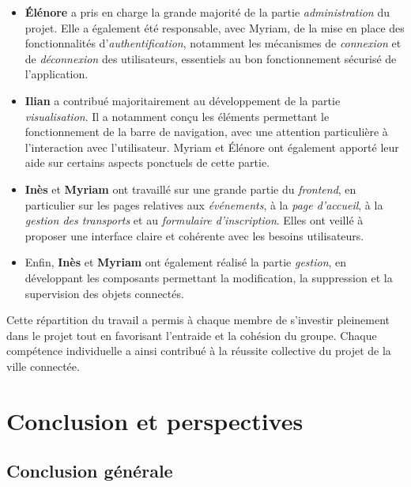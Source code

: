 \documentclass[a4paper,12pt]{report}
\begin{document}
\begin{itemize}
    \item \textbf{Élénore} a pris en charge la grande majorité de la partie \textit{administration} du projet. Elle a également été responsable, avec Myriam, de la mise en place des fonctionnalités d’\textit{authentification}, notamment les mécanismes de \textit{connexion} et de \textit{déconnexion} des utilisateurs, essentiels au bon fonctionnement sécurisé de l’application.
    
    \item \textbf{Ilian} a contribué majoritairement au développement de la partie \textit{visualisation}. Il a notamment conçu les éléments permettant le fonctionnement de la barre de navigation, avec une attention particulière à l’interaction avec l’utilisateur. Myriam et Élénore ont également apporté leur aide sur certains aspects ponctuels de cette partie.

    \item \textbf{Inès} et \textbf{Myriam} ont travaillé sur une grande partie du \textit{frontend}, en particulier sur les pages relatives aux \textit{événements}, à la \textit{page d'accueil}, à la \textit{gestion des transports} et au \textit{formulaire d’inscription}. Elles ont veillé à proposer une interface claire et cohérente avec les besoins utilisateurs.

    \item Enfin, \textbf{Inès} et \textbf{Myriam} ont également réalisé la partie \textit{gestion}, en développant les composants permettant la modification, la suppression et la supervision des objets connectés.
\end{itemize}

Cette répartition du travail a permis à chaque membre de s’investir pleinement dans le projet tout en favorisant l'entraide et la cohésion du groupe. Chaque compétence individuelle a ainsi contribué à la réussite collective du projet de la ville connectée.

	

	\newpage
	
	\section{Conclusion et perspectives}
	
	\subsection{Conclusion générale}
	
\end{document}
